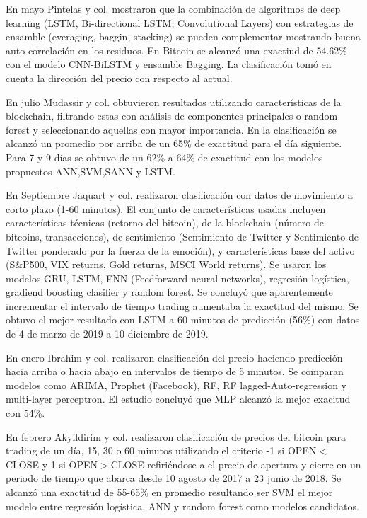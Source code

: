 En mayo Pintelas y col. \parencite*{pintelasInvestigatingProblemCryptocurrency2020} mostraron que la combinación de algoritmos de deep learning (LSTM, Bi-directional LSTM, Convolutional Layers) con estrategias de ensamble (everaging, baggin, stacking) se pueden complementar mostrando buena auto-correlación en los residuos.  En Bitcoin se alcanzó una exactiud de 54.62\% con el modelo CNN-BiLSTM y ensamble Bagging. La clasificación tomó en cuenta la dirección del precio con respecto al actual.

En julio Mudassir y col. \parencite*{mudassirTimeseriesForecastingBitcoin2020} obtuvieron resultados utilizando características de la blockchain, filtrando estas con análisis de componentes principales o random forest y seleccionando aquellas con mayor importancia. En la clasificación se alcanzó un promedio por arriba de un 65\% de exactitud para el día siguiente. Para 7 y 9 días se obtuvo de un 62\% a 64\% de exactitud con los modelos propuestos ANN,SVM,SANN y LSTM. 

En Septiembre Jaquart y col. \parencite*{jaquartShorttermBitcoinMarket2021} realizaron clasificación con datos de movimiento a corto plazo (1-60 minutos). El conjunto de características usadas incluyen características técnicas (retorno del bitcoin), de la blockchain (número de bitcoins, transacciones), de sentimiento (Sentimiento de Twitter y Sentimiento de Twitter ponderado por la fuerza de la emoción), y características base del activo (S\&P500, VIX returns, Gold returns, MSCI World returns). Se usaron los modelos GRU, LSTM, FNN (Feedforward neural networks), regresión logística, gradiend boosting clasifier y random forest. Se concluyó que aparentemente incrementar el intervalo de tiempo trading aumentaba la exactitud del mismo. Se obtuvo el mejor resultado con LSTM a 60 minutos de predicción (56\%) con datos de 4 de marzo de 2019 a 10 diciembre de 2019.

En enero Ibrahim y col. \parencite*{ibrahimPredictingMarketMovement2021} realizaron clasificación del precio haciendo predicción hacia arriba o hacia abajo en intervalos de tiempo de 5 minutos. Se comparan modelos como ARIMA, Prophet (Facebook), RF, RF lagged-Auto-regression y multi-layer perceptron. El estudio concluyó que MLP alcanzó la mejor exacitud con 54\%.

En febrero Akyildirim y col. \parencite*{akyildirimPredictionCryptocurrencyReturns2021} realizaron clasificación de precios del bitcoin para trading de un día, 15, 30 o 60 minutos utilizando el criterio -1 si OPEN$<$CLOSE y 1 si OPEN$>$CLOSE refiriéndose a el precio de apertura y cierre en un periodo de tiempo que abarca desde 10 agosto de 2017 a 23 junio de 2018. Se alcanzó una exactitud de 55-65\% en promedio resultando ser SVM el mejor modelo entre regresión logística, ANN y random forest como modelos candidatos.

